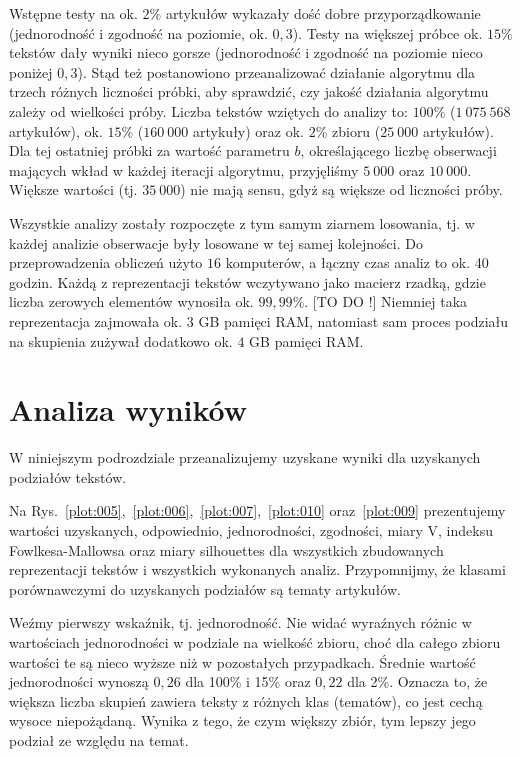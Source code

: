 \documentclass{praca1}
\begin{document}
Wstępne testy na ok. $2\%$ artykułów wykazały dość dobre przyporządkowanie (jednorodność i zgodność na poziomie,  ok. $0,3$). Testy na większej próbce ok. $15\%$ tekstów dały wyniki nieco gorsze (jednorodność i zgodność na poziomie nieco poniżej $0,3$). Stąd też postanowiono przeanalizować działanie algorytmu dla trzech różnych liczności próbki, aby sprawdzić, czy jakość działania algorytmu zależy od wielkości próby. Liczba tekstów wziętych do analizy to: $100\%$ ($1\ 075\ 568$ artykułów), ok. $15\%$ ($160\ 000$ artykuły) oraz ok. $2\%$ zbioru ($25\ 000$ artykułów). Dla tej ostatniej próbki za wartość parametru $b$, określającego liczbę obserwacji mających wkład w każdej iteracji algorytmu, przyjęliśmy $5\ 000$ oraz $10\ 000$. Większe wartości (tj. $35\ 000$) nie mają sensu, gdyż są większe od liczności próby.

Wszystkie analizy zostały rozpoczęte z tym samym ziarnem losowania, tj. w każdej analizie obserwacje były losowane w tej samej kolejności. Do przeprowadzenia obliczeń użyto $16$ komputerów, a łączny czas analiz to ok. 40 godzin. Każdą z reprezentacji tekstów wczytywano jako macierz rzadką, gdzie liczba zerowych elementów wynosiła ok. $99,99\%$. [TO DO !] Niemniej taka reprezentacja zajmowała ok. $3$ GB pamięci RAM, natomiast sam proces podziału na skupienia zużywał dodatkowo ok. $4$ GB pamięci RAM.

\section{Analiza wyników}


W niniejszym podrozdziale przeanalizujemy uzyskane wyniki dla uzyskanych podziałów tekstów.

Na Rys.~\ref{plot:005},~\ref{plot:006},~\ref{plot:007},~\ref{plot:010} oraz~\ref{plot:009} prezentujemy wartości uzyskanych, odpowiednio, jednorodności, zgodności, miary V, indeksu Fowlkesa-Mallowsa oraz miary silhouettes dla wszystkich zbudowanych reprezentacji tekstów i wszystkich wykonanych analiz. Przypomnijmy, że klasami porównawczymi do uzyskanych podziałów są tematy artykułów.

Weźmy pierwszy wskaźnik, tj. jednorodność. Nie widać wyraźnych różnic w wartościach jednorodności w podziale na wielkość zbioru, choć dla całego zbioru wartości te są nieco wyższe niż w pozostałych przypadkach. Średnie wartość jednorodności wynoszą $0,26$ dla 100\% i 15\% oraz $0,22$ dla 2\%. Oznacza to, że większa liczba skupień zawiera teksty z różnych klas (tematów), co jest cechą wysoce niepożądaną. Wynika z tego, że czym większy zbiór, tym lepszy jego podział ze względu na temat.
\end{document}
